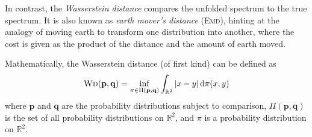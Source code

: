 In contrast,
the \emph{Wasserstein distance} \cite{wd}
compares the unfolded spectrum to the true spectrum.
%
It is also known as \emph{earth mover's distance} (\textsc{Emd}),
  hinting at the analogy of moving earth to transform one distribution into another,
    where the cost is given as the product of the distance and the amount of earth moved.

Mathematically, the Wasserstein distance (of first kind) can be defined as
\begin{equation}
  \text{\textsc{Wd}}(\mathbf{p}, \mathbf{q}) = \inf_{\pi \in \Pi(\mathbf{p}, \mathbf{q})} \int_{\mathbb{R}^2} |x - y| \, \mathrm{d}\pi(x, y)
\end{equation}
where
  $\mathbf{p}$ and $\mathbf{q}$ are the probability distributions subject to comparison,
  $\Pi(\mathbf{p}, \mathbf{q})$ is the set of all probability distributions on $\mathbb{R}^2$,
  and $\pi$ is a probability distribution on $\mathbb{R}^2$.
